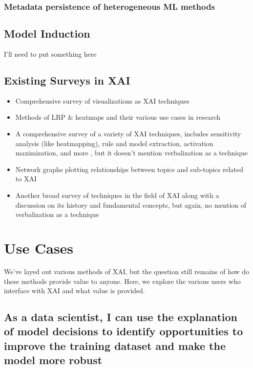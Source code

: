 \documentclass{IEEEtran}
\begin{document}
\subsubsection{Metadata persistence of heterogeneous ML methods}

\subsection{Model Induction}

I'll need to put something here

\subsection{Existing Surveys in XAI}

\begin{itemize}
    \item Comprehensive survey of visualizations as XAI techniques \cite{Hohman2018}
    \item Methods of LRP \& heatmaps and their various use cases in research\cite{MONTAVON20181}
    \item A comprehensive survey of a variety of XAI techniques, includes sensitivity analysis (like heatmapping), rule and model extraction, activation maximization, and more \cite{Guidotti:2018:SME:3271482.3236009}, but it doesn't mention verbalization as a technique
    \item Network graphs plotting relationships between topics and sub-topics related to XAI \cite{Abdul:2018:TTE:3173574.3174156}
    \item Another broad survey of techniques in the field of XAI along with a discussion on its history and fundamental concepts, but again, no mention of verbalization as a technique\cite{Adadi2018}
\end{itemize}

\section{Use Cases} \label{sec:UseCases}

We've layed out various methods of XAI, but the question still remains of how do these methods provide value to anyone.  Here, we explore the various users who interface with XAI and what value is provided.

\subsection{As a data scientist, I can use the explanation of model decisions to identify opportunities to improve the training dataset and make the model more robust}
\end{document}
